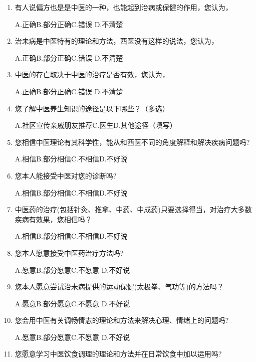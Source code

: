 \begin{enumerate}
A.正确\qquad B.部分正确\qquad C.错误 \qquad D.不清楚


\item 有人说偏方也是是中医的一种，也能起到治病或保健的作用，您认为，

A.正确\qquad B.部分正确\qquad C.错误 \qquad D.不清楚

\item 
治未病是中医特有的理论和方法，西医没有这样的说法，您认为，

A.正确\qquad B.部分正确\qquad C.错误 \qquad D.不清楚

\item 中医的存亡取决于中医的治疗是否有效，您认为，

A.正确\qquad B.部分正确\qquad C.错误 \qquad D.不清楚

\item 您了解中医养生知识的途径是以下哪些？（多选）

A.社区宣传\qquad 亲戚朋友推荐\qquad C.医生\qquad D.其他途径（填写）\underline{\makebox[6em]{}}

\item 
您相信中医理论有其科学性，能从和西医不同的角度解释和解决疾病问题吗?

A.相信\qquad B.部分相信\qquad C.不相信\qquad D.不好说

\item 您本人能接受中医对您的诊断吗?

A.相信\qquad B.部分相信\qquad C.不相信\qquad D.不好说

\item 中医药的治疗(包括针灸、推拿、中药、中成药)只要选择得当，对治疗大多数疾病有效果，您相信吗？

A.相信\qquad B.部分相信\qquad C.不相信\qquad D.不好说

\item 您本人愿意接受中医药治疗方法吗?

A.愿意\qquad B.部分愿意\qquad C.不愿意 \qquad D.不好说

\item 您本人愿意尝试治未病提供的运动保健(太极拳、气功等)的方法吗？

A.愿意\qquad B.部分愿意\qquad C.不愿意 \qquad D.不好说

\item 您会用中医有关调畅情志的理论和方法来解决心理、情绪上的问题吗?

A.愿意\qquad B.部分愿意\qquad C.不愿意 \qquad D.不好说

\item 您愿意学习中医饮食调理的理论和方法并在日常饮食中加以运用吗?


\end{enumerate}

